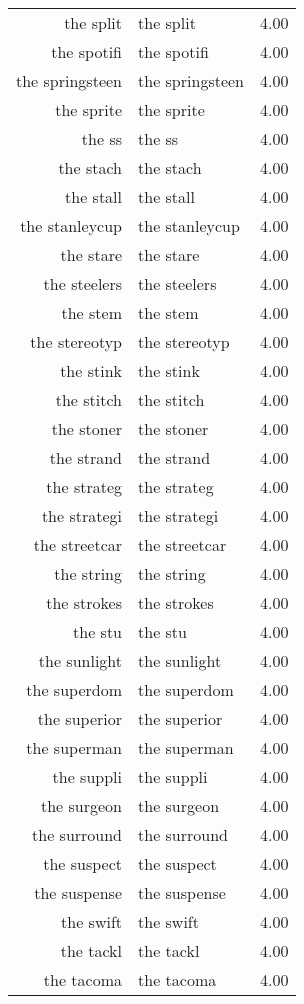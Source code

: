 \begin{table}[ht]
\begin{tabular}{rlr}
  the split & the split & 4.00 \\ 
  the spotifi & the spotifi & 4.00 \\ 
  the springsteen & the springsteen & 4.00 \\ 
  the sprite & the sprite & 4.00 \\ 
  the ss & the ss & 4.00 \\ 
  the stach & the stach & 4.00 \\ 
  the stall & the stall & 4.00 \\ 
  the stanleycup & the stanleycup & 4.00 \\ 
  the stare & the stare & 4.00 \\ 
  the steelers & the steelers & 4.00 \\ 
  the stem & the stem & 4.00 \\ 
  the stereotyp & the stereotyp & 4.00 \\ 
  the stink & the stink & 4.00 \\ 
  the stitch & the stitch & 4.00 \\ 
  the stoner & the stoner & 4.00 \\ 
  the strand & the strand & 4.00 \\ 
  the strateg & the strateg & 4.00 \\ 
  the strategi & the strategi & 4.00 \\ 
  the streetcar & the streetcar & 4.00 \\ 
  the string & the string & 4.00 \\ 
  the strokes & the strokes & 4.00 \\ 
  the stu & the stu & 4.00 \\ 
  the sunlight & the sunlight & 4.00 \\ 
  the superdom & the superdom & 4.00 \\ 
  the superior & the superior & 4.00 \\ 
  the superman & the superman & 4.00 \\ 
  the suppli & the suppli & 4.00 \\ 
  the surgeon & the surgeon & 4.00 \\ 
  the surround & the surround & 4.00 \\ 
  the suspect & the suspect & 4.00 \\ 
  the suspense & the suspense & 4.00 \\ 
  the swift & the swift & 4.00 \\ 
  the tackl & the tackl & 4.00 \\ 
  the tacoma & the tacoma & 4.00 \\ 

\end{tabular}
\end{table}
